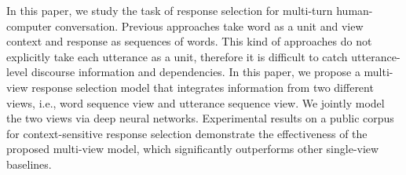 In this paper, we study the task of response selection for multi-turn human-computer conversation. Previous approaches take word as a unit and view context and response as sequences of words. This kind of approaches do not explicitly take each utterance as a unit, therefore it is difficult to catch utterance-level discourse information and dependencies. In this paper, we propose a multi-view response selection model that integrates information from two different views, i.e., word sequence view and utterance sequence view. We jointly model the two views via deep neural networks. Experimental results on a public corpus for context-sensitive response selection demonstrate the effectiveness of the proposed multi-view model, which significantly outperforms other single-view baselines.
